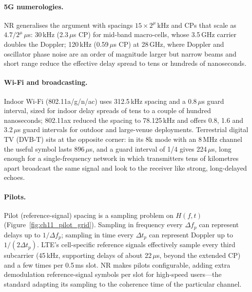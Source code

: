 \paragraph{5G numerologies.} NR generalises the argument with spacings $15\times2^\mu$\,kHz and
CPs that scale as $4.7/2^\mu\,\mu$s: 30\,kHz (2.3\,$\mu$s CP) for mid-band macro-cells, whose
3.5\,GHz carrier doubles the Doppler; 120\,kHz (0.59\,$\mu$s CP) at 28\,GHz, where Doppler and oscillator
phase noise are an order of magnitude larger but narrow beams and short range reduce the effective
delay spread to tens or hundreds of nanoseconds.

\paragraph{Wi-Fi and broadcasting.} Indoor Wi-Fi (802.11a/g/n/ac) uses 312.5\,kHz spacing and a
0.8\,$\mu$s guard interval, sized for indoor delay spreads of tens to a couple of hundred nanoseconds;
802.11ax reduced the spacing to 78.125\,kHz and offers 0.8, 1.6 and 3.2\,$\mu$s guard intervals for
outdoor and large-venue deployments. Terrestrial digital TV (DVB-T) sits at the opposite corner: in
its 8k mode with an 8\,MHz channel the useful symbol lasts 896\,$\mu$s, and a guard interval of 1/4
gives 224\,$\mu$s, long enough for a single-frequency network in which transmitters tens of kilometres
apart broadcast the same signal and look to the receiver like strong, long-delayed echoes.

\paragraph{Pilots.} Pilot (reference-signal) spacing is a sampling problem on $H(f,t)$
(Figure~\ref{fig:ch11_pilot_grid}). Sampling in frequency every $\Delta f_p$ can represent delays up
to $1/\Delta f_p$; sampling in time every $\Delta t_p$ can represent Doppler up to $1/(2\Delta t_p)$.
LTE's cell-specific reference signals effectively sample every third subcarrier (45\,kHz, supporting
delays of about 22\,$\mu$s, beyond the extended CP) and a few times per 0.5\,ms slot. NR makes pilots
configurable, adding extra demodulation reference-signal symbols per slot for high-speed users---the
standard adapting its sampling to the coherence time of the particular channel.


